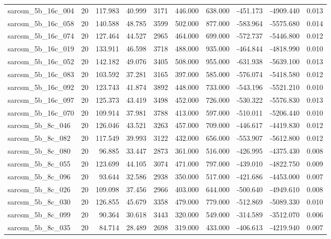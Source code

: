 \begin{tabular}{lrrrrrrrrr}
sarcsm\_5b\_16c\_004 & 20 & 117.983 & 40.999 & 3171 & 446.000 & 638.000 & -451.173 & -4909.440 & 0.013 \\
sarcsm\_5b\_16c\_058 & 20 & 140.588 & 48.785 & 3599 & 502.000 & 877.000 & -583.964 & -5575.680 & 0.014 \\
sarcsm\_5b\_16c\_074 & 20 & 127.464 & 44.527 & 2965 & 464.000 & 699.000 & -572.737 & -5446.800 & 0.012 \\
sarcsm\_5b\_16c\_019 & 20 & 133.911 & 46.598 & 3718 & 488.000 & 935.000 & -464.844 & -4818.990 & 0.010 \\
sarcsm\_5b\_16c\_052 & 20 & 142.182 & 49.076 & 3405 & 508.000 & 955.000 & -631.938 & -5639.100 & 0.013 \\
sarcsm\_5b\_16c\_083 & 20 & 103.592 & 37.281 & 3165 & 397.000 & 585.000 & -576.074 & -5418.580 & 0.012 \\
sarcsm\_5b\_16c\_092 & 20 & 123.743 & 41.874 & 3892 & 448.000 & 733.000 & -543.196 & -5521.210 & 0.010 \\
sarcsm\_5b\_16c\_097 & 20 & 125.373 & 43.419 & 3498 & 452.000 & 726.000 & -530.322 & -5576.830 & 0.013 \\
sarcsm\_5b\_16c\_070 & 20 & 109.914 & 37.981 & 3788 & 413.000 & 597.000 & -510.011 & -5206.440 & 0.010 \\
sarcsm\_5b\_8c\_046 & 20 & 126.046 & 43.521 & 3263 & 457.000 & 709.000 & -446.617 & -4419.830 & 0.012 \\
sarcsm\_5b\_8c\_082 & 20 & 117.549 & 39.993 & 3122 & 432.000 & 656.000 & -553.907 & -5612.800 & 0.012 \\
sarcsm\_5b\_8c\_080 & 20 & 96.885 & 33.447 & 2873 & 361.000 & 516.000 & -426.995 & -4375.430 & 0.008 \\
sarcsm\_5b\_8c\_055 & 20 & 123.699 & 44.105 & 3074 & 471.000 & 797.000 & -439.010 & -4822.750 & 0.009 \\
sarcsm\_5b\_8c\_096 & 20 & 93.644 & 32.586 & 2938 & 350.000 & 517.000 & -421.686 & -4453.000 & 0.007 \\
sarcsm\_5b\_8c\_026 & 20 & 109.098 & 37.456 & 2966 & 403.000 & 644.000 & -500.640 & -4949.610 & 0.008 \\
sarcsm\_5b\_8c\_030 & 20 & 126.855 & 45.679 & 3358 & 479.000 & 779.000 & -512.869 & -5089.330 & 0.010 \\
sarcsm\_5b\_8c\_099 & 20 & 90.364 & 30.618 & 3443 & 320.000 & 549.000 & -314.589 & -3512.070 & 0.006 \\
sarcsm\_5b\_8c\_035 & 20 & 84.714 & 28.489 & 2698 & 319.000 & 433.000 & -406.613 & -4219.940 & 0.007 \\

\end{tabular}
